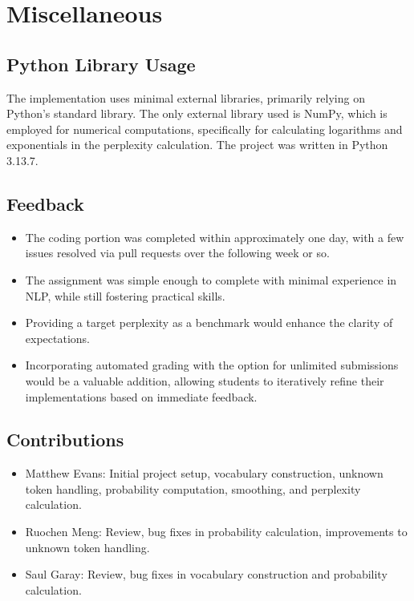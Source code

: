\documentclass[a4paper]{article}
\begin{document}
\section{Miscellaneous}

\subsection{Python Library Usage}
The implementation uses minimal external libraries, primarily relying on Python's standard library. The only external library used is NumPy, which is employed for numerical computations, specifically for calculating logarithms and exponentials in the perplexity calculation. The project was written in Python 3.13.7.

\subsection{Feedback}
\begin{itemize}
  \item The coding portion was completed within approximately one day, with a few issues resolved via pull requests over the following week or so.
  \item The assignment was simple enough to complete with minimal experience in NLP, while still fostering practical skills.
  \item Providing a target perplexity as a benchmark would enhance the clarity of expectations.
  \item Incorporating automated grading with the option for unlimited submissions would be a valuable addition, allowing students to iteratively refine their implementations based on immediate feedback.
\end{itemize}

\subsection{Contributions}
\begin{itemize}
  \item Matthew Evans: Initial project setup, vocabulary construction, unknown token handling, probability computation, smoothing, and perplexity calculation.
  \item Ruochen Meng: Review, bug fixes in probability calculation, improvements to unknown token handling.
  \item Saul Garay: Review, bug fixes in vocabulary construction and probability calculation.
\end{itemize}
\end{document}
